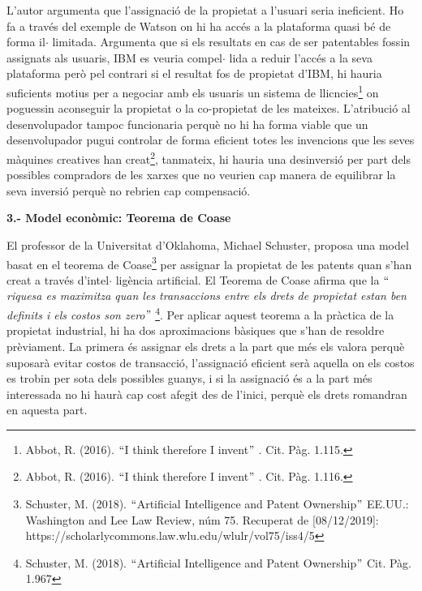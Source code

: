\documentclass[12pt]{article}
\renewcommand{\_}{\kern-1.5pt\textunderscore\kern-1.5pt}
\begin{document}
\begin{itemize}
\vspace{\baselineskip}
\begin{justify}
L’autor argumenta que l’assignació de la propietat a l’usuari seria ineficient. Ho fa a través del exemple de Watson on hi ha accés a la plataforma quasi bé de forma il$ \cdot $ limitada. Argumenta que si els resultats en cas de ser patentables fossin assignats als usuaris, IBM es veuria compel$ \cdot $ lida a reduir l’accés a la seva plataforma però pel contrari si el resultat fos de propietat d’IBM, hi hauria suficients motius per a negociar amb els usuaris un sistema de llicncies\footnote{ Abbot, R. (2016). $``$I think therefore I invent$"$ . Cit. Pàg. 1.115. } on poguessin aconseguir la propietat o la co-propietat de les mateixes. L’atribució al desenvolupador tampoc funcionaria perquè no hi ha forma viable que un desenvolupador pugui controlar de forma eficient totes les invencions que les seves màquines creatives han creat\footnote{ Abbot, R. (2016). $``$I think therefore I invent$"$ . Cit. Pàg. 1.116. }, tanmateix, hi hauria una desinversió per part dels possibles compradors de les xarxes que no veurien cap manera de equilibrar la seva inversió perquè no rebrien cap compensació. 
\end{justify}\par


\vspace{\baselineskip}
\begin{justify}
\textbf{3.- Model econòmic: Teorema de Coase}
\end{justify}\par


\vspace{\baselineskip}
\begin{justify}
El professor de la Universitat d’Oklahoma, Michael Schuster, proposa una model basat en el teorema de Coase\footnote{ Schuster, M. (2018). $``$Artificial Intelligence and Patent Ownership$"$  EE.UU.: Washington and Lee Law Review, núm 75. Recuperat de [08/12/2019]: https://scholarlycommons.law.wlu.edu/wlulr/vol75/iss4/5 } per assignar la propietat de les patents quan s’han creat a través d’intel$ \cdot $ ligència artificial.  El Teorema de Coase afirma que la $``$\textit{riquesa es maximitza quan les transaccions entre els drets de propietat estan ben definits i els costos son zero}$"$ \footnote{ Schuster, M. (2018). $``$Artificial Intelligence and Patent Ownership$"$  Cit. Pàg. 1.967 }. Per aplicar aquest teorema a la pràctica de la propietat industrial, hi ha dos aproximacions bàsiques que s’han de resoldre prèviament. La primera és assignar els drets a la part que més els valora perquè suposarà evitar costos de transacció, l’assignació eficient serà aquella on els costos es trobin per sota dels possibles guanys, i si la assignació és a la part més interessada no hi haurà cap cost afegit des de l’inici, perquè els drets romandran en aquesta part. 
\end{justify}\par



\end{itemize}
\end{document}
